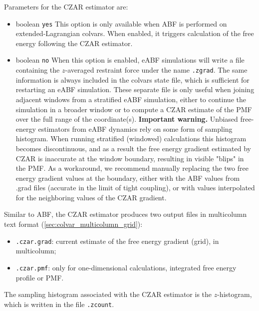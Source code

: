 Parameters for the CZAR estimator are:
\begin{itemize}
 \item {}
  {boolean}
  {\texttt{yes}}
{This option is only available when ABF is performed on extended-Lagrangian colvars.
When enabled, it triggers calculation of the free energy following the CZAR estimator.}

 \item {}
  {boolean}
  {\texttt{no}}
{When this option is enabled, eABF simulations will write a file containing the
$z$-averaged restraint force under the name \outputName\texttt{.zgrad}.
The same information is always included in the colvars state file, which is sufficient
for restarting an eABF simulation.
These separate file is only useful when joining adjacent windows from a stratified
eABF simulation, either to continue the simulation in a broader window or to
compute a CZAR estimate of the PMF over the full range of the coordinate(s).
\textbf{Important warning.} Unbiased free-energy estimators from eABF dynamics rely
on some form of sampling histogram. When running stratified (windowed) calculations
this histogram becomes discontinuous, and as a result the free energy gradient estimated
by CZAR is inaccurate at the window boundary, resulting in visible "blips" in the PMF.
As a workaround, we recommend manually replacing the two
free energy gradient values at the boundary, either with the ABF values from .grad files
(accurate in the limit of tight coupling), or with values interpolated for the neighboring
values of the CZAR gradient.
}
\end{itemize}

Similar to ABF, the CZAR estimator produces two output files in multicolumn text format (\ref{sec:colvar_multicolumn_grid}):
\begin{itemize}
\item \outputName\texttt{.czar.grad}: current estimate of the free energy gradient (grid),
  in multicolumn;
\item \outputName\texttt{.czar.pmf}: only for one-dimensional calculations, integrated
  free energy profile or PMF.
\end{itemize}
The sampling histogram associated with the CZAR estimator is the $z$-histogram,
which is written in the file \outputName\texttt{.zcount}.

